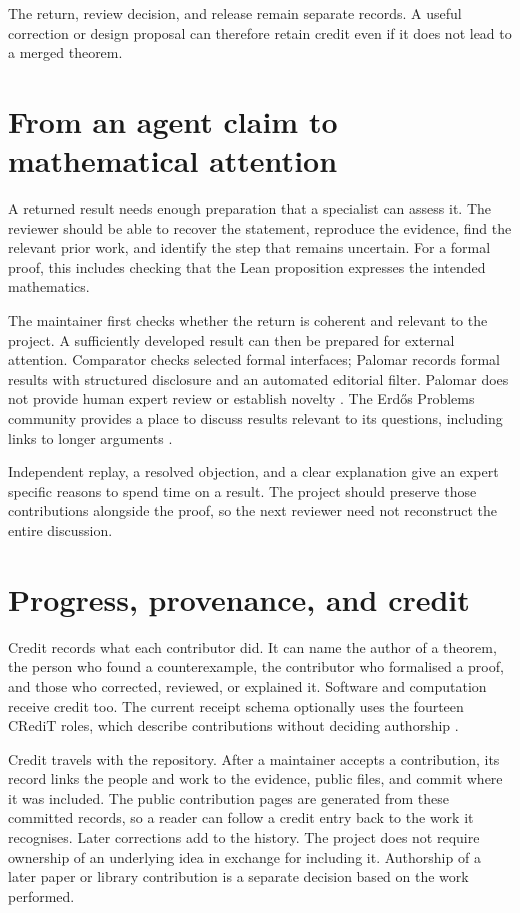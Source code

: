 \documentclass[10pt]{article}
\begin{document}
The return, review decision, and release remain separate records. A useful
correction or design proposal can therefore retain credit even if it does not
lead to a merged theorem.

\section{From an agent claim to mathematical attention}\label{sec:attention}

A returned result needs enough preparation that a specialist can assess it.
The reviewer should be able to recover the statement, reproduce the evidence,
find the relevant prior work, and identify the step that remains uncertain.
For a formal proof, this includes checking that the Lean proposition expresses
the intended mathematics.

The maintainer first checks whether the return is coherent and relevant to the
project. A sufficiently developed result can then be prepared for external
attention. Comparator checks selected formal interfaces; Palomar records
formal results with structured disclosure and an automated editorial filter.
Palomar does not provide human expert review or establish novelty
\cite{palomar}. The Erd\H{o}s Problems community provides a place to discuss
results relevant to its questions, including links to longer arguments
\cite{erdosproblems}.

Independent replay, a resolved objection, and a clear explanation give an
expert specific reasons to spend time on a result. The project should preserve
those contributions alongside the proof, so the next reviewer need not
reconstruct the entire discussion.

\section{Progress, provenance, and credit}\label{sec:credit}

Credit records what each contributor did. It can name the author of a theorem,
the person who found a counterexample, the contributor who formalised a proof,
and those who corrected, reviewed, or explained it. Software and computation
receive credit too. The current receipt schema optionally uses the fourteen
CRediT roles, which describe contributions without deciding authorship
\cite{credit}.

Credit travels with the repository. After a maintainer accepts a contribution,
its record links the people and work to the evidence, public files, and commit
where it was included. The public contribution pages are generated from these
committed records, so a reader can follow a credit entry back to the work it
recognises. Later corrections add to the history. The project does not require
ownership of an underlying idea in exchange for including it. Authorship of a
later paper or library contribution is a separate decision based on the work
performed.
\end{document}
